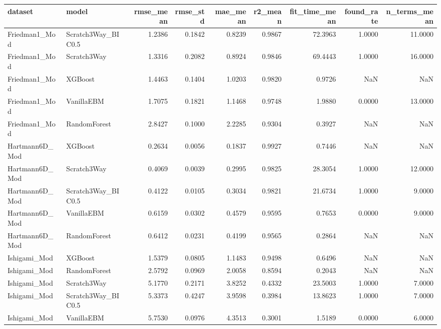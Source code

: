 \begin{tabular}{llrrrrrrr}
\toprule
dataset & model & rmse_mean & rmse_std & mae_mean & r2_mean & fit_time_mean & found_rate & n_terms_mean \\
\midrule
Friedman1_Mod & Scratch3Way_BIC0.5 & 1.2386 & 0.1842 & 0.8239 & 0.9867 & 72.3963 & 1.0000 & 11.0000 \\
Friedman1_Mod & Scratch3Way & 1.3316 & 0.2082 & 0.8924 & 0.9846 & 69.4443 & 1.0000 & 16.0000 \\
Friedman1_Mod & XGBoost & 1.4463 & 0.1404 & 1.0203 & 0.9820 & 0.9726 & NaN & NaN \\
Friedman1_Mod & VanillaEBM & 1.7075 & 0.1821 & 1.1468 & 0.9748 & 1.9880 & 0.0000 & 13.0000 \\
Friedman1_Mod & RandomForest & 2.8427 & 0.1000 & 2.2285 & 0.9304 & 0.3927 & NaN & NaN \\
Hartmann6D_Mod & XGBoost & 0.2634 & 0.0056 & 0.1837 & 0.9927 & 0.7446 & NaN & NaN \\
Hartmann6D_Mod & Scratch3Way & 0.4069 & 0.0039 & 0.2995 & 0.9825 & 28.3054 & 1.0000 & 12.0000 \\
Hartmann6D_Mod & Scratch3Way_BIC0.5 & 0.4122 & 0.0105 & 0.3034 & 0.9821 & 21.6734 & 1.0000 & 9.0000 \\
Hartmann6D_Mod & VanillaEBM & 0.6159 & 0.0302 & 0.4579 & 0.9595 & 0.7653 & 0.0000 & 9.0000 \\
Hartmann6D_Mod & RandomForest & 0.6412 & 0.0231 & 0.4199 & 0.9565 & 0.2864 & NaN & NaN \\
Ishigami_Mod & XGBoost & 1.5379 & 0.0805 & 1.1483 & 0.9498 & 0.6496 & NaN & NaN \\
Ishigami_Mod & RandomForest & 2.5792 & 0.0969 & 2.0058 & 0.8594 & 0.2043 & NaN & NaN \\
Ishigami_Mod & Scratch3Way & 5.1770 & 0.2171 & 3.8252 & 0.4332 & 23.5003 & 1.0000 & 7.0000 \\
Ishigami_Mod & Scratch3Way_BIC0.5 & 5.3373 & 0.4247 & 3.9598 & 0.3984 & 13.8623 & 1.0000 & 7.0000 \\
Ishigami_Mod & VanillaEBM & 5.7530 & 0.0976 & 4.3513 & 0.3001 & 1.5189 & 0.0000 & 6.0000 \\
\bottomrule
\end{tabular}
